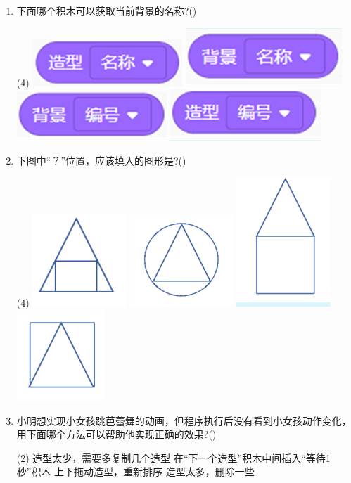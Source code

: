 \documentclass[10.5pt, a4paper]{article}
\begin{document}
\begin{enumerate}
        \item 下面哪个积木可以获取当前背景的名称?(\qquad)
        \begin{tasks}(4)
            \task \includegraphics[width=.12\textwidth]{17a.png}
            \task \includegraphics[width=.12\textwidth]{17b.png}
            \task \includegraphics[width=.12\textwidth]{17c.png}
            \task \includegraphics[width=.12\textwidth]{17d.png}
        \end{tasks}

        \item 下图中“？”位置，应该填入的图形是?(\qquad)
        \begin{tasks}(4)
            \task \includegraphics[width=.05\textwidth]{18a.png}
            \task \includegraphics[width=.05\textwidth]{18b.png}
            \task \includegraphics[width=.05\textwidth]{18c.png}
            \task \includegraphics[width=.05\textwidth]{18d.png}
        \end{tasks}

        \item 小明想实现小女孩跳芭蕾舞的动画，但程序执行后没有看到小女孩动作变化，用下面哪个方法可以帮助他实现正确的效果?(\qquad)
        \begin{tasks}(2)
            \task 造型太少，需要多复制几个造型
            \task 在“下一个造型”积木中间插入“等待1秒”积木
            \task 上下拖动造型，重新排序
            \task 造型太多，删除一些
        \end{tasks}


\end{enumerate}
\end{document}
